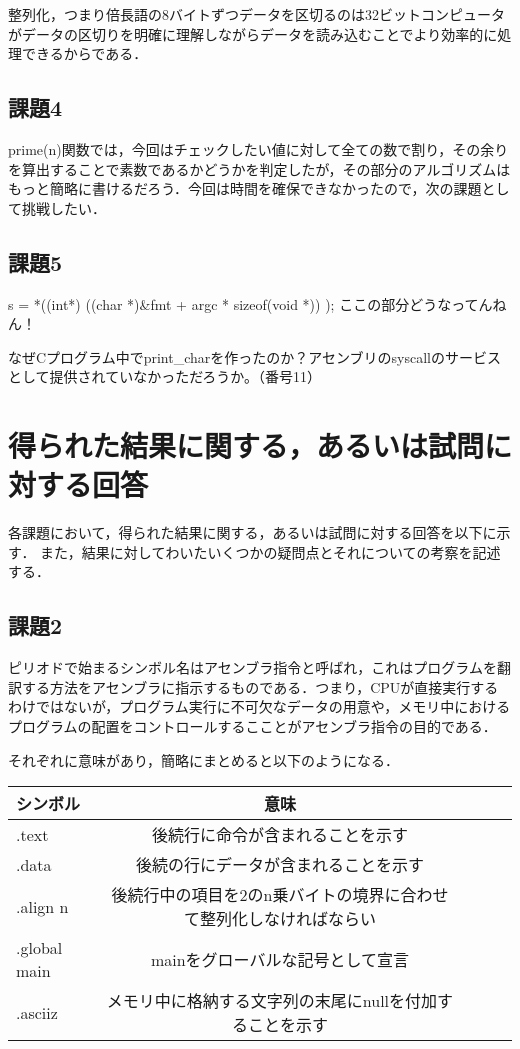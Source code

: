 \documentclass[a4j]{jarticle}
\begin{document}
整列化，つまり倍長語の8バイトずつデータを区切るのは32ビットコンピュータがデータの区切りを明確に理解しながらデータを読み込むことでより効率的に処理できるからである．




\subsection{課題4}

prime(n)関数では，今回はチェックしたい値に対して全ての数で割り，その余りを算出することで素数であるかどうかを判定したが，その部分のアルゴリズムはもっと簡略に書けるだろう．今回は時間を確保できなかったので，次の課題として挑戦したい．


\subsection{課題5}

s = *((int*) ((char *)&fmt + argc * sizeof(void *)) ); ここの部分どうなってんねん！

なぜCプログラム中でprint_charを作ったのか？アセンブリのsyscallのサービスとして提供されていなかっただろうか。（番号11）




%
%

\section{得られた結果に関する，あるいは試問に対する回答}


各課題において，得られた結果に関する，あるいは試問に対する回答を以下に示す．
また，結果に対してわいたいくつかの疑問点とそれについての考察を記述する．


\subsection{課題2}

ピリオドで始まるシンボル名はアセンブラ指令と呼ばれ，これはプログラムを翻訳する方法をアセンブラに指示するものである．つまり，CPUが直接実行するわけではないが，プログラム実行に不可欠なデータの用意や，メモリ中におけるプログラムの配置をコントロールするこことがアセンブラ指令の目的である．

それぞれに意味があり，簡略にまとめると以下のようになる．

\begin{center}
\begin{tabular}{lclcl}\hline
シンボル&意味\\ \hline \hline
.text&後続行に命令が含まれることを示す\\ \hline
.data&後続の行にデータが含まれることを示す\\ \hline
.align n&後続行中の項目を2のn乗バイトの境界に合わせて整列化しなければならい\\ \hline
.global main&mainをグローバルな記号として宣言\\ \hline
.asciiz&メモリ中に格納する文字列の末尾にnullを付加することを示す\\ \hline
\end{tabular}
\end{center}
\end{document}
